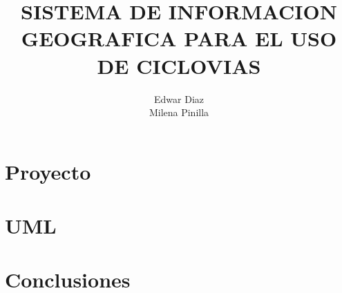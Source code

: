 \documentclass[11pt]{book}
\title{SISTEMA DE INFORMACION GEOGRAFICA PARA EL USO DE CICLOVIAS}
\author{Edwar Diaz \\ Milena Pinilla}
\begin{document}
	\maketitle
	\tableofcontents
\part{Proyecto}

\part{UML}


\part{Conclusiones}

\end{document}
